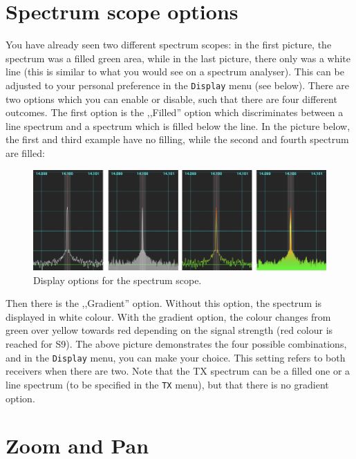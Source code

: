 \documentclass[12pt]{book}
\def\bltt#1{\texttt{\color{blue}#1}}
\begin{document}
\section{Spectrum scope options}
\label{sec:FillingGradient}

You have already seen two different spectrum scopes: in the first
picture, the  spectrum was a filled green area, while in the last
picture, there only was a white line (this is similar to what you
would see on a spectrum analyser). This can be adjusted to your
personal preference in the \bltt{Display} menu (see below). There
are two options which you can enable or disable, such that there
are four different outcomes. The first option is the ,,Filled'' option
which discriminates between a line spectrum and a spectrum which is
filled below the line. In the picture below, the first and third
example have no filling, while the second and fourth spectrum
are filled:

\begin{figure}[ht]
\center
\includegraphics[width=12cm]{ScopeFilling.png}
\caption{Display options for the spectrum scope.}
\end{figure}

Then there is the ,,Gradient'' option. Without this option, the
spectrum is displayed in white colour. With the gradient option,
the colour changes from green over yellow towards red depending
on the signal strength (red colour is reached for S9). The above
picture demonstrates the four possible combinations, and in
the \bltt{Display} menu, you can make your choice. This setting
refers to both receivers when there are two. Note that the TX
spectrum can be a filled one or a line spectrum (to be specified
in the \bltt{TX} menu), but that there
is no gradient option.

\section{Zoom and Pan}
\label{sec:ZoomPanArea}
\end{document}
